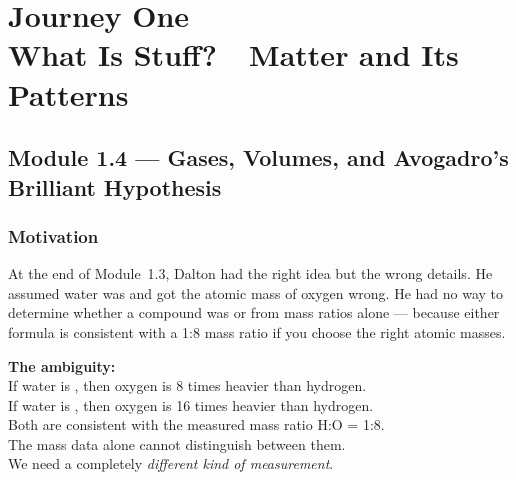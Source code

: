 \documentclass[12pt, a4paper]{book}
\theoremstyle{definition}
\begin{document}
\setcounter{chapter}{0}
\chapter[Journey 1 --- What Is Stuff?]
        {Journey One\\[8pt]
         \textcolor{ModuleColor}{\large What Is Stuff?\ \ Matter and Its Patterns}}
\setcounter{section}{3}

\section{Module 1.4 --- Gases, Volumes, and Avogadro's Brilliant Hypothesis}
\label{sec:mod1.4}

\subsection*{Motivation}

At the end of Module~1.3, Dalton had the right idea
but the wrong details.
He assumed water was  and got the atomic mass of oxygen wrong.
He had no way to determine whether a compound was  or 
from mass ratios alone --- because either formula is consistent
with a 1:8 mass ratio if you choose the right atomic masses.

\begin{center}
\begin{tcolorbox}[
  enhanced, colback=LightBg, colframe=JourneyColor!40,
  width=0.86\textwidth, arc=3pt, fontupper=\sffamily
]
\centering
\textbf{The ambiguity:}\\[6pt]
\small
If water is , then oxygen is 8 times heavier than hydrogen.\\
If water is , then oxygen is 16 times heavier than hydrogen.\\[6pt]
\normalsize
Both are consistent with the measured mass ratio H:O = 1:8.\\[4pt]
The mass data alone cannot distinguish between them.\\
We need a completely \emph{different kind of measurement}.
\end{tcolorbox}
\end{center}

\vspace{0.5em}
\end{document}
